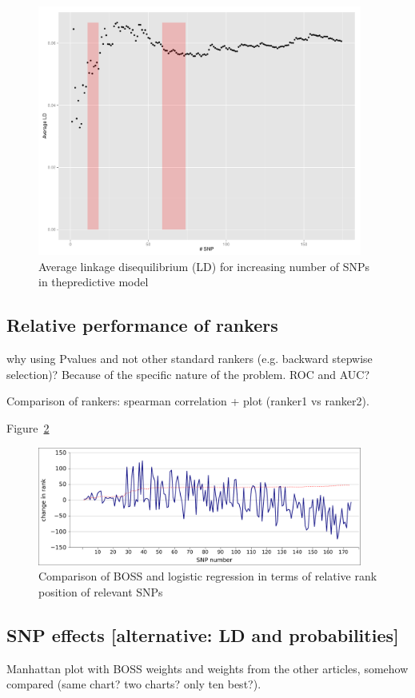 \begin{figure}
\includegraphics[width=0.95\textwidth]{LD.pdf}
\caption{Average linkage disequilibrium (LD) for increasing number of
  SNPs in thepredictive model}
\label{fig:ld} 
\end{figure}

\subsection{Relative performance of rankers}
why using Pvalues and not other standard rankers (e.g. backward stepwise
selection)? Because of the specific nature of the problem. ROC and AUC?

Comparison of rankers: spearman correlation + plot (ranker1 vs ranker2).

Figure~\ref{fig:rank}

\begin{figure}
\includegraphics[width=0.95\textwidth]{rank.pdf}
\caption{Comparison of BOSS and logistic regression in terms of relative
rank position of relevant SNPs}
\label{fig:rank} 
\end{figure}


\subsection{SNP effects [alternative: LD and probabilities]}
Manhattan plot with BOSS weights and weights from the other articles,
somehow compared (same chart? two charts? only ten best?).


